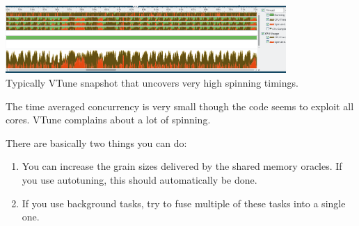 \begin{center}
 \includegraphics[width=0.8\textwidth]{67_shared-memory-tuning/vtune.png}
 \\
 {\footnotesize
  Typically VTune snapshot that uncovers very high spinning timings.  
 }
\end{center}

\begin{smell}
  The time averaged concurrency is very small though the code seems to exploit
  all cores. VTune complains about a lot of spinning.
\end{smell}

\noindent
There are basically two things you can do: 

\begin{enumerate}
  \item You can increase the grain sizes delivered by the shared memory oracles.
  If you use autotuning, this should automatically be done.
  \item If you use background tasks, try to fuse multiple of these tasks into
  a single one.
\end{enumerate}

